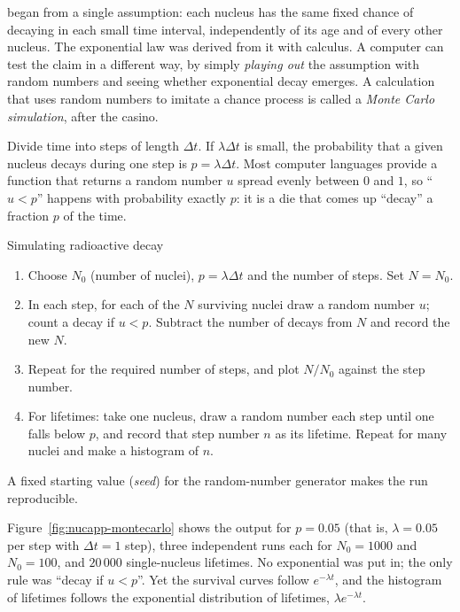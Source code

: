  began from a single assumption: each nucleus has the same fixed chance of decaying in
each small time interval, independently of its age and of every other nucleus. The exponential law was
derived from it with calculus. A computer can test the claim in a different way, by simply \emph{playing
out} the assumption with random numbers and seeing whether exponential decay emerges. A calculation that
uses random numbers to imitate a chance process is called a \emph{Monte Carlo simulation}, after the
casino.

Divide time into steps of length $\Delta t$. If $\lambda\Delta t$ is small, the probability that a given
nucleus decays during one step is $p=\lambda\Delta t$. Most computer languages provide a function that
returns a random number $u$ spread evenly between $0$ and $1$, so ``$u<p$'' happens with probability
exactly $p$: it is a die that comes up ``decay'' a fraction $p$ of the time.

\begin{methodbox}{Simulating radioactive decay}
\begin{enumerate}[label=\arabic*.,itemsep=1pt]
\item Choose $N_0$ (number of nuclei), $p=\lambda\Delta t$ and the number of steps. Set $N=N_0$.
\item In each step, for each of the $N$ surviving nuclei draw a random number $u$; count a decay if
      $u<p$. Subtract the number of decays from $N$ and record the new $N$.
\item Repeat for the required number of steps, and plot $N/N_0$ against the step number.
\item For lifetimes: take one nucleus, draw a random number each step until one falls below $p$, and record
      that step number $n$ as its lifetime. Repeat for many nuclei and make a histogram of $n$.
\end{enumerate}
A fixed starting value (\emph{seed}) for the random-number generator makes the run reproducible.
\end{methodbox}

Figure~\ref{fig:nucapp-montecarlo} shows the output for $p=0.05$ (that is, $\lambda=0.05$ per step with
$\Delta t=1$ step), three independent runs each for $N_0=1000$ and $N_0=100$, and $20\,000$ single-nucleus
lifetimes. No exponential was put in; the only rule was ``decay if $u<p$''. Yet the survival curves follow
$e^{-\lambda t}$, and the histogram of lifetimes follows the exponential distribution of lifetimes,
$\lambda e^{-\lambda t}$.

